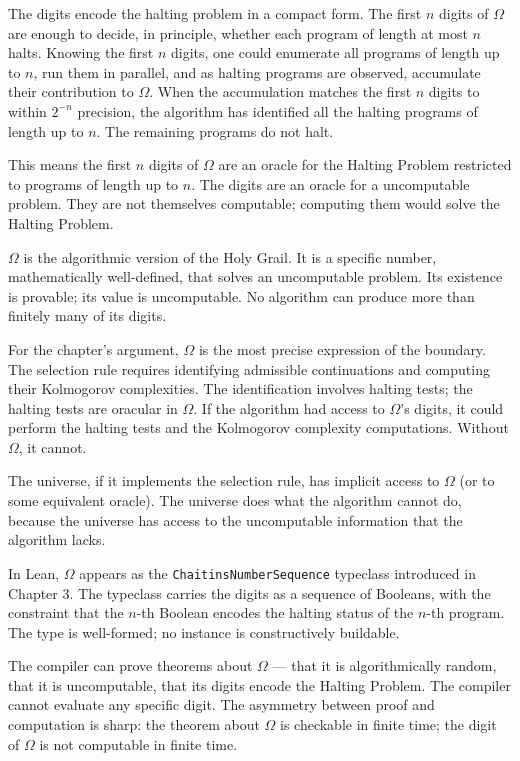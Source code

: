 The digits encode the halting problem in a compact form. The first $n$
digits of $\Omega$ are enough to decide, in principle, whether each
program of length at most $n$ halts. Knowing the first $n$ digits, one
could enumerate all programs of length up to $n$, run them in
parallel, and as halting programs are observed, accumulate their
contribution to $\Omega$. When the accumulation matches the first $n$
digits to within $2^{-n}$ precision, the algorithm has identified all
the halting programs of length up to $n$. The remaining programs do
not halt.

This means the first $n$ digits of $\Omega$ are an oracle for the
Halting Problem restricted to programs of length up to $n$. The
digits are an oracle for a uncomputable problem. They are not
themselves computable; computing them would solve the Halting Problem.

$\Omega$ is the algorithmic version of the Holy Grail. It is a
specific number, mathematically well-defined, that solves an
uncomputable problem. Its existence is provable; its value is
uncomputable. No algorithm can produce more than finitely many of
its digits.

For the chapter's argument, $\Omega$ is the most precise expression
of the boundary. The selection rule requires identifying admissible
continuations and computing their Kolmogorov complexities. The
identification involves halting tests; the halting tests are
oracular in $\Omega$. If the algorithm had access to $\Omega$'s
digits, it could perform the halting tests and the Kolmogorov
complexity computations. Without $\Omega$, it cannot.

The universe, if it implements the selection rule, has implicit
access to $\Omega$ (or to some equivalent oracle). The universe
does what the algorithm cannot do, because the universe has access
to the uncomputable information that the algorithm lacks.

In Lean, $\Omega$ appears as the \texttt{ChaitinsNumberSequence}
typeclass introduced in Chapter 3. The typeclass carries the digits
as a sequence of Booleans, with the constraint that the $n$-th
Boolean encodes the halting status of the $n$-th program. The type
is well-formed; no instance is constructively buildable.

The compiler can prove theorems about $\Omega$ --- that it is
algorithmically random, that it is uncomputable, that its digits
encode the Halting Problem. The compiler cannot evaluate any
specific digit. The asymmetry between proof and computation is
sharp: the theorem about $\Omega$ is checkable in finite time; the
digit of $\Omega$ is not computable in finite time.

